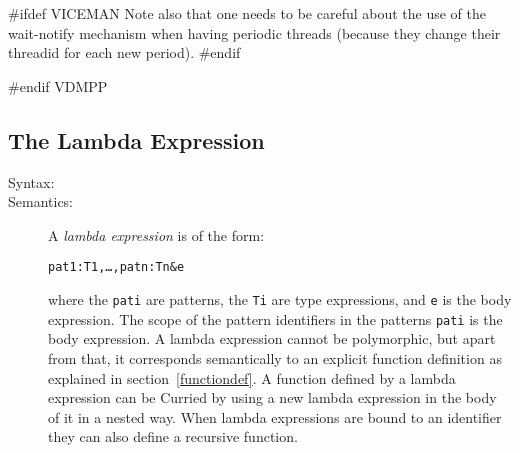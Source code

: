 \documentclass[\pformat,12pt]{article}
\begin{document}
\begin{description}
#ifdef VICEMAN
Note also that one needs to be careful about the use of the wait-notify
mechanism when having periodic threads (because they change their threadid 
for each new period).
#endif

\end{description}
#endif VDMPP

\subsection{The Lambda Expression}\label{lambda}

\begin{description}
\item[Syntax:]



        
\item[Semantics:] A {\it lambda expression} is of the form:
  \begin{alltt}
     pat1 : T1, \ldots, patn : Tn \& e
  \end{alltt}
  where the {\tt pati} are patterns, the {\tt Ti} are type expressions, and
  {\tt e} is the body expression. The scope of the pattern identifiers in
  the patterns {\tt pati} is the body expression. A lambda expression
  cannot be polymorphic, but apart from that, it corresponds semantically
  to an explicit function definition as explained in
  section~\ref{functiondef}. A function defined by a lambda expression can
  be Curried by using a new lambda expression in the body of it in a nested
  way. When lambda expressions are bound to an identifier they can also
  define a recursive function.


\end{description}
\end{document}
